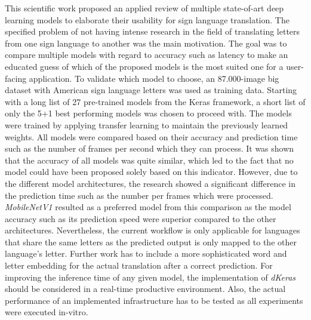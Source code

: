 This scientific work proposed an applied review of multiple state-of-art deep learning models to elaborate their usability for sign language translation. The specified problem of not having intense research in the field of translating letters from one sign language to another was the main motivation. The goal was to compare multiple models with regard to accuracy such as latency to make an educated guess of which of the proposed models is the most suited one for a user-facing application. To validate which model to choose, an 87.000-image big dataset with American sign language letters was used as training data. Starting with a long list of 27 pre-trained models from the Keras framework, a short list of only the 5+1 best performing models was chosen to proceed with. The models were trained by applying transfer learning to maintain the previously learned weights. All models were compared based on their accuracy and prediction time such as the number of frames per second which they can process. It was shown that the accuracy of all models was quite similar, which led to the fact that no model could have been proposed solely based on this indicator. However, due to the different model architectures, the research showed a significant difference in the prediction time such as the number per frames which were processed. \textit{MobileNetV1} resulted as a preferred model from this comparison as the model accuracy such as its prediction speed were superior compared to the other architectures.
Nevertheless, the current workflow is only applicable for languages that share the same letters as the predicted output is only mapped to the other language's letter. Further work has to include a more sophisticated word and letter embedding for the actual translation after a correct prediction. For improving the inference time of any given model, the implementation of \textit{dKeras} should be considered in a real-time productive environment.
Also, the actual performance of an implemented infrastructure has to be tested as all experiments were executed in-vitro.